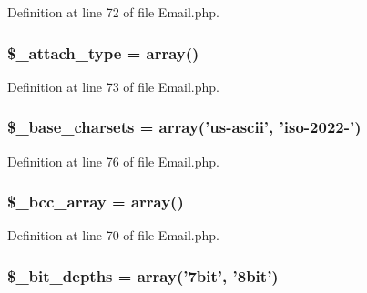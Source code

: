 Definition at line 72 of file Email.\-php.

\subsubsection[{\$\-\_\-attach\-\_\-type}]{\setlength{\rightskip}{0pt plus 5cm}\$\-\_\-attach\-\_\-type = array()}\label{class_c_i___email_aab19518d4680c05dea288162e684f0cb}


Definition at line 73 of file Email.\-php.

\subsubsection[{\$\-\_\-base\-\_\-charsets}]{\setlength{\rightskip}{0pt plus 5cm}\$\-\_\-base\-\_\-charsets = array('us-\/ascii', 'iso-\/2022-\/')}\label{class_c_i___email_a212a02e70f089ba2e1a29bd6f45b0691}


Definition at line 76 of file Email.\-php.

\subsubsection[{\$\-\_\-bcc\-\_\-array}]{\setlength{\rightskip}{0pt plus 5cm}\$\-\_\-bcc\-\_\-array = array()}\label{class_c_i___email_a9e55a2ff848d216fa27361d3c66d979d}


Definition at line 70 of file Email.\-php.

\subsubsection[{\$\-\_\-bit\-\_\-depths}]{\setlength{\rightskip}{0pt plus 5cm}\$\-\_\-bit\-\_\-depths = array('7bit', '8bit')}\label{class_c_i___email_a65b779b2385490a293d286a135bdf00c}


